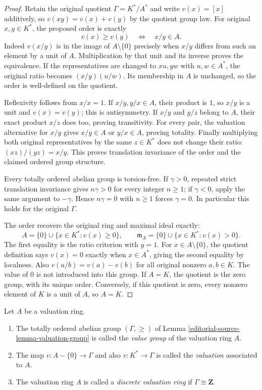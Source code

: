 \begin{proof}
Retain the original quotient
$\Gamma=K^*/A^*$ and write
$v(x)=[x]$ additively, so
$v(xy)=v(x)+v(y)$ by the
quotient group law. For original
$x,y\in K^*$, the proposed
order is exactly
$$
v(x)\geq v(y)\quad\Longleftrightarrow\quad x/y\in A.
$$
Indeed $v(x/y)$ is in the
image of $A\setminus\{0\}$
precisely when $x/y$ differs
from such an element by
a unit of $A$. Multiplication
by that unit and its inverse
proves the equivalence.
If the representatives are
changed to $xu,yw$ with
$u,w\in A^*$, the original
ratio becomes $(x/y)(u/w)$.
Its membership in $A$ is
unchanged, so the order is
well-defined on the quotient.

Reflexivity follows from $x/x=1$.
If $x/y,y/x\in A$, their
product is $1$, so $x/y$
is a unit and $v(x)=v(y)$;
this is antisymmetry. If
$x/y$ and $y/z$ belong
to $A$, their exact product
$x/z$ does too, proving
transitivity. For every pair,
the valuation alternative for
$x/y$ gives $x/y\in A$
or $y/x\in A$, proving
totality. Finally multiplying
both original representatives
by the same $z\in K^*$
does not change their ratio:
$(xz)/(yz)=x/y$. This
proves translation invariance
of the order and the
claimed ordered group structure.

Every totally ordered abelian
group is torsion-free. If
$\gamma>0$, repeated strict
translation invariance gives
$n\gamma>0$ for every integer
$n\geq1$; if $\gamma<0$,
apply the same argument to
$-\gamma$. Hence $n\gamma=0$
with $n\geq1$ forces
$\gamma=0$. In particular
this holds for the original
$\Gamma$.

The order recovers the
original ring and maximal
ideal exactly:
$$
A=\{0\}\cup\{x\in K^*:v(x)\geq0\},\qquad
\mathfrak m_A=\{0\}\cup\{x\in K^*:v(x)>0\}.
$$
The first equality is the
ratio criterion with $y=1$.
For $x\in A\setminus\{0\}$,
the quotient definition says
$v(x)=0$ exactly when
$x\in A^*$, giving the
second equality by localness.
Also $v(a/b)=v(a)-v(b)$
for all original nonzero
$a,b\in K$. The value
of $0$ is not introduced
into this group. If $A=K$,
the quotient is the zero
group, with its unique order.
Conversely, if this quotient
is zero, every nonzero
element of $K$ is a unit
of $A$, so $A=K$.
\end{proof}

\begin{definition}
\label{editorial-source-definition-value-group}
Let $A$ be a valuation ring.
\begin{enumerate}
\item The totally ordered abelian group $(\Gamma, \geq)$ of
Lemma \ref{editorial-source-lemma-valuation-group} is called the
{\it value group} of the valuation ring $A$.
\item The map $v : A - \{0\} \to \Gamma$ and also $v : K^* \to \Gamma$ is
called the {\it valuation} associated to $A$.
\item The valuation ring $A$ is called a {\it discrete valuation ring}
if $\Gamma \cong \mathbf{Z}$.
\end{enumerate}
\end{definition}

